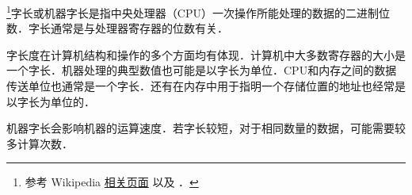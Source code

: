 
\begin{issues}
\issueDraft
\end{issues}

\footnote{参考 Wikipedia \href{https://en.wikipedia.org/wiki/Word_(computer_architecture)}{相关页面} 以及 \cite{唐计}．}字长或机器字长是指中央处理器（CPU）一次操作所能处理的数据的二进制位数．字长通常是与处理器寄存器的位数有关．

字长度在计算机结构和操作的多个方面均有体现．计算机中大多数寄存器的大小是一个字长．机器处理的典型数值也可能是以字长为单位．CPU和内存之间的数据传送单位也通常是一个字长．还有在内存中用于指明一个存储位置的地址也经常是以字长为单位的．

机器字长会影响机器的运算速度．若字长较短，对于相同数量的数据，可能需要较多计算次数．
